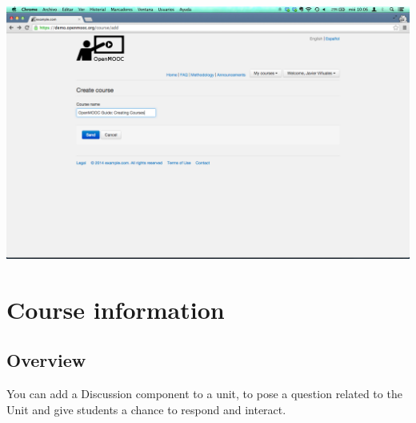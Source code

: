 \documentclass[letterpaper,10pt,english]{sphinxmanual}
\begin{document}
\begin{enumerate}
\includegraphics{3_create_course-3.png}

\end{enumerate}


\chapter{Course information}
\label{course_information:course-information}\label{course_information::doc}\label{course_information:id1}

\section{Overview}
\label{course_information:overview}
You can add a Discussion component to a unit, to pose a question related to the
Unit and give students a chance to respond and interact.
\end{document}
